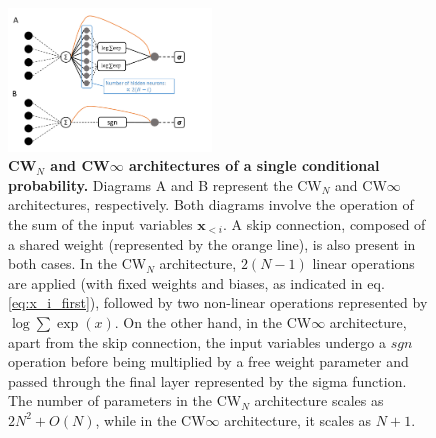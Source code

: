 \documentclass[aps,physrev,10pt,floatfix,reprint]{revtex4-2}
\begin{document}
\begin{figure}[!h]
    \centering 
    \includegraphics[width=0.48\textwidth]{img/CW_arch.pdf}
    \caption{\textbf{CW$_N$ and CW$\infty$ architectures of a single conditional probability.}  Diagrams A and B represent the CW$_N$ and CW$\infty$ architectures, respectively. Both diagrams involve the operation of the sum of the input variables $\mathbf{x}_{<i}$. A skip connection, composed of a shared weight (represented by the orange line), is also present in both cases. In the CW$_N$ architecture, $2(N-1)$ linear operations are applied (with fixed weights and biases, as indicated in eq.\ref{eq:x_i_first}), followed by two non-linear operations represented by $\log \sum \exp(x)$. On the other hand, in the CW$\infty$ architecture, apart from the skip connection, the input variables undergo a $sgn$ operation before being multiplied by a free weight parameter and passed through the final layer represented by the sigma function. The number of parameters in the CW$_N$ architecture scales as $2N^2+O(N)$, while in the CW$\infty$ architecture, it scales as $N+1$.}
    \label{fig:CW_arch}
\end{figure}
\end{document}
